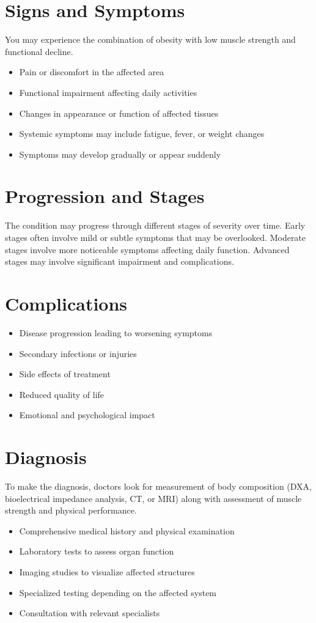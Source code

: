 \section{Signs and Symptoms}
You may experience the combination of obesity with low muscle strength and functional decline.

\begin{itemize}[noitemsep]
  \item Pain or discomfort in the affected area
  \item Functional impairment affecting daily activities
  \item Changes in appearance or function of affected tissues
  \item Systemic symptoms may include fatigue, fever, or weight changes
  \item Symptoms may develop gradually or appear suddenly
\end{itemize}
\section{Progression and Stages}
The condition may progress through different stages of severity over time. Early stages often involve mild or subtle symptoms that may be overlooked. Moderate stages involve more noticeable symptoms affecting daily function. Advanced stages may involve significant impairment and complications.
\section{Complications}
\begin{itemize}[noitemsep]
  \item Disease progression leading to worsening symptoms
  \item Secondary infections or injuries
  \item Side effects of treatment
  \item Reduced quality of life
  \item Emotional and psychological impact
\end{itemize}
\section{Diagnosis}
To make the diagnosis, doctors look for measurement of body composition (DXA, bioelectrical impedance analysis, CT, or MRI) along with assessment of muscle strength and physical performance.

\begin{itemize}[noitemsep]
  \item Comprehensive medical history and physical examination
  \item Laboratory tests to assess organ function
  \item Imaging studies to visualize affected structures
  \item Specialized testing depending on the affected system
  \item Consultation with relevant specialists
\end{itemize}
